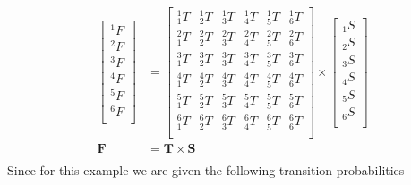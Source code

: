 \documentclass[a4paper,10pt]{article}
\newcommand{\st}[1]{\ensuremath{_{#1}{S}}}
\newcommand{\fin}[1]{\ensuremath{^{#1}{F}}}
\newcommand{\trans}[2]{\ensuremath{_{#1}^{#2}{T}}}
\begin{document}
\begin{equation*}
\begin{split}
\left[\begin{array}{r}
\fin{1} \\ \fin{2} \\ \fin{3} \\ \fin{4} \\ \fin{5} \\ \fin{6} \\
\end{array}\right]
&=
\left[\begin{array}{rrrrrr}
\trans{1}{1} & \trans{2}{1} & \trans{3}{1} & \trans{4}{1} & \trans{5}{1} & \trans{6}{1} \\
\trans{1}{2} & \trans{2}{2} & \trans{3}{2} & \trans{4}{2} & \trans{5}{2} & \trans{6}{2} \\
\trans{1}{3} & \trans{2}{3} & \trans{3}{3} & \trans{4}{3} & \trans{5}{3} & \trans{6}{3} \\
\trans{1}{4} & \trans{2}{4} & \trans{3}{4} & \trans{4}{4} & \trans{5}{4} & \trans{6}{4} \\
\trans{1}{5} & \trans{2}{5} & \trans{3}{5} & \trans{4}{5} & \trans{5}{5} & \trans{6}{5} \\
\trans{1}{6} & \trans{2}{6} & \trans{3}{6} & \trans{4}{6} & \trans{5}{6} & \trans{6}{6} \\
\end{array}\right]\times
\left[\begin{array}{r}
\st{1} \\ \st{2} \\ \st{3} \\ \st{4} \\ \st{5} \\ \st{6} \\
\end{array}\right]\\
\mathbf{F} &= \mathbf{T}\times\mathbf{S}\\
\end{split} 
\end{equation*}
\newline\noindent\newline\noindent
Since for this example we are given the following transition probabilities
\end{document}
